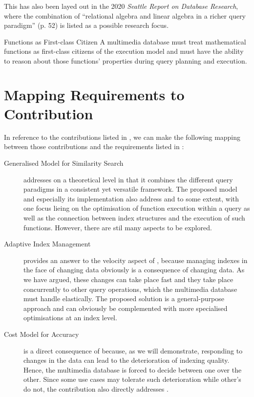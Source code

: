 This has also been layed out in the 2020 \emph{Seattle Report on Database Research}, where the combination of ``relational algebra and linear algebra in a richer query paradigm'' \cite{Abadi:2020Seattle} (p. 52) is listed as a possible research focus.

\begin{requirement}[label=requirement:functions]{Functions as First-class Citizen}{}
    A multimedia database must treat mathematical functions as first-class citizens of the execution model and must have the ability to reason about those functions' properties during query planning and execution.
\end{requirement}

\section{Mapping Requirements to Contribution}

In reference to the contributions listed in , we can make the following mapping between those contributions and the requirements listed in :

\begin{description}
    \item[Generalised Model for Similarity Search] addresses  on a theoretical level in that it combines the different query paradigms in a consistent yet versatile framework. The proposed model and especially its implementation also address  and  to some extent, with one focus lieing on the optimisation of function execution within a query as well as the connection between index structures and the execution of such functions. However, there are stil many aspects to be explored.
    \item[Adaptive Index Management] provides an answer to the velocity aspect of , because managing indexes in the face of changing data obviously is a consequence of changing data. As we have argued, these changes can take place fast and they take place concurrently to other query operations, which the multimedia database must handle elastically. The proposed solution is a general-purpose approach and can obviously be complemented with more specialised optimisations at an index level.
    \item[Cost Model for Accuracy] is a direct consequence of  because, as we will demonstrate, responding to changes in the data can lead to the deterioration of indexing quality. Hence, the multimedia database is forced to decide between one over the other. Since some use cases may tolerate such deterioration while other's do not, the contribution also directly addresses .
\end{description}